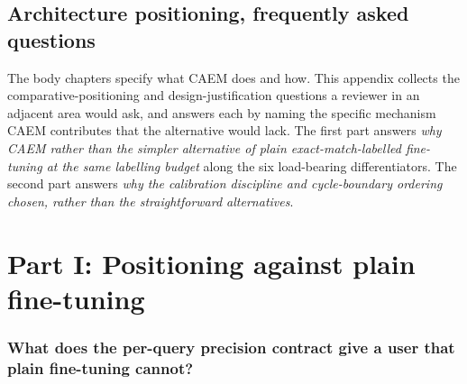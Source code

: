 %

\chapter[Architecture positioning]{Architecture positioning, frequently asked questions}
\label{app:positioning-qa}

The body chapters specify what CAEM does and how. This appendix collects the comparative-positioning and design-justification questions a reviewer in an adjacent area would ask, and answers each by naming the specific mechanism CAEM contributes that the alternative would lack. The first part answers \emph{why CAEM rather than the simpler alternative of plain exact-match-labelled fine-tuning at the same labelling budget} along the six load-bearing differentiators. The second part answers \emph{why the calibration discipline and cycle-boundary ordering chosen, rather than the straightforward alternatives}.

\part*{Part I: Positioning against plain fine-tuning}


\section[Per-query precision contract]{What does the per-query precision contract give a user that plain fine-tuning cannot?}
\label{app:qa-precision-contract}

